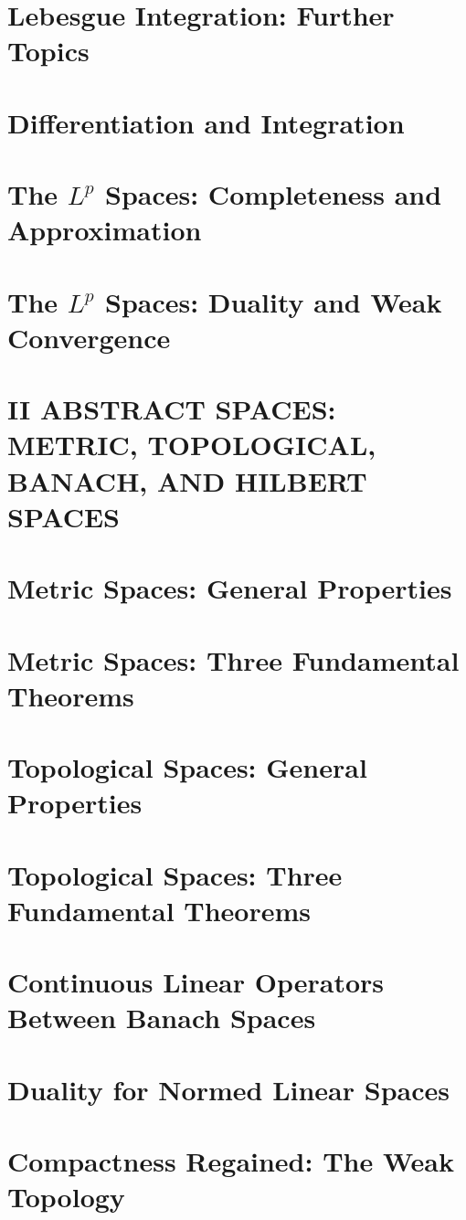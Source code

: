 \documentclass[a4paper,10pt]{book}
\theoremstyle{plain} %
\begin{document}
\chapter{Lebesgue Integration: Further Topics}
\chapter{Differentiation and Integration}
\chapter{The $L^p$ Spaces: Completeness and Approximation}
\chapter{The $L^p$ Spaces: Duality and Weak Convergence}

\setcounter{chapter}{0}
\chapter*{II ABSTRACT SPACES: METRIC, TOPOLOGICAL, BANACH, AND HILBERT SPACES}
\setcounter{chapter}{8}

\chapter{Metric Spaces: General Properties}
\chapter{Metric Spaces: Three Fundamental Theorems}
\chapter{Topological Spaces: General Properties}
\chapter{Topological Spaces: Three Fundamental Theorems}
\chapter{Continuous Linear Operators Between Banach Spaces}
\chapter{Duality for Normed Linear Spaces}
\chapter{Compactness Regained: The Weak Topology}
\end{document}
